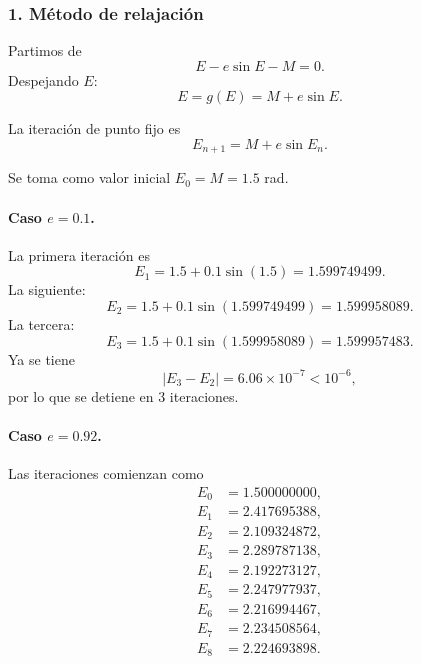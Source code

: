 \documentclass[11pt,a4paper]{article}
\begin{document}
\subsubsection*{1. Método de relajación}

Partimos de
\[
E-e\sin E-M=0.
\]
Despejando $E$:
\begin{equation}
\boxed{E=g(E)=M+e\sin E.}
\end{equation}

La iteración de punto fijo es
\begin{equation}
\boxed{E_{n+1}=M+e\sin E_n.}
\end{equation}

Se toma como valor inicial $E_0=M=1.5$ rad.

\paragraph{Caso $e=0.1$.}

La primera iteración es
\[
E_1=1.5+0.1\sin(1.5)=1.599749499.
\]
La siguiente:
\[
E_2=1.5+0.1\sin(1.599749499)=1.599958089.
\]
La tercera:
\[
E_3=1.5+0.1\sin(1.599958089)=1.599957483.
\]
Ya se tiene
\[
|E_3-E_2|=6.06\times10^{-7}<10^{-6},
\]
por lo que se detiene en 3 iteraciones.

\paragraph{Caso $e=0.92$.}

Las iteraciones comienzan como
\begin{align}
E_0&=1.500000000,\\
E_1&=2.417695388,\\
E_2&=2.109324872,\\
E_3&=2.289787138,\\
E_4&=2.192273127,\\
E_5&=2.247977937,\\
E_6&=2.216994467,\\
E_7&=2.234508564,\\
E_8&=2.224693898.
\end{align}
\end{document}
